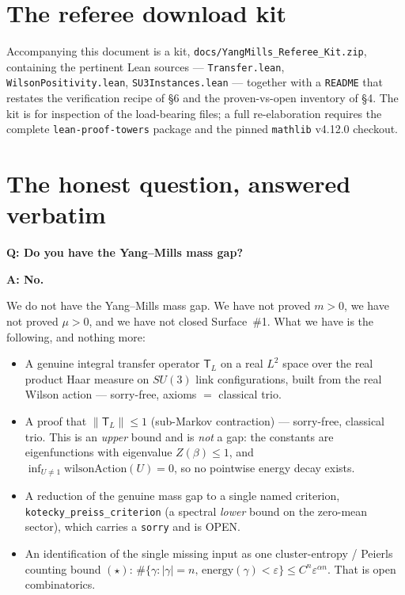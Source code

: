 \documentclass[11pt]{article}
\newcommand{\TL}{\mathsf{T}_L}
\newcommand{\code}[1]{\texttt{#1}}
\begin{document}
\section{The referee download kit}

Accompanying this document is a kit,
\code{docs/YangMills\_Referee\_Kit.zip}, containing the pertinent
Lean sources --- \code{Transfer.lean}, \code{WilsonPositivity.lean},
\code{SU3Instances.lean} --- together with a \code{README} that
restates the verification recipe of \S6 and the proven-vs-open
inventory of \S4. The kit is for inspection of the load-bearing
files; a full re-elaboration requires the complete
\code{lean-proof-towers} package and the pinned \code{mathlib}
v4.12.0 checkout.

\section{The honest question, answered verbatim}

\noindent\textbf{Q: Do you have the Yang--Mills mass gap?}

\medskip
\noindent\textbf{A: No.}

\medskip
\noindent We do not have the Yang--Mills mass gap. We have not proved
$m>0$, we have not proved $\mu>0$, and we have not closed Surface~\#1.
What we have is the following, and nothing more:

\begin{itemize}
  \item A genuine integral transfer operator $\TL$ on a real $L^2$
        space over the real product Haar measure on $SU(3)$ link
        configurations, built from the real Wilson action ---
        sorry-free, axioms $=$ classical trio.
  \item A proof that $\lVert\TL\rVert\le 1$ (sub-Markov contraction)
        --- sorry-free, classical trio. This is an \emph{upper}
        bound and is \emph{not} a gap: the constants are
        eigenfunctions with eigenvalue $Z(\beta)\le 1$, and
        $\inf_{U\neq 1}\mathrm{wilsonAction}(U)=0$, so no pointwise
        energy decay exists.
  \item A reduction of the genuine mass gap to a single named
        criterion, \code{kotecky\_preiss\_criterion} (a spectral
        \emph{lower} bound on the zero-mean sector), which carries a
        \code{sorry} and is OPEN.
  \item An identification of the single missing input as one
        cluster-entropy / Peierls counting bound $(\star)$:
        $\#\{\gamma:\lvert\gamma\rvert=n,\,\mathrm{energy}(\gamma)<\varepsilon\}
        \le C^n\varepsilon^{\alpha n}$. That is open combinatorics.
\end{itemize}
\end{document}
